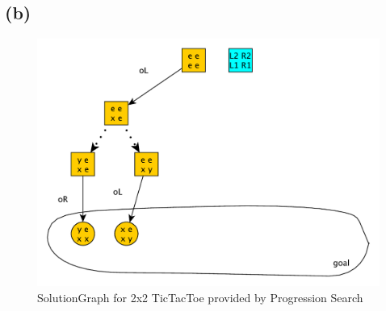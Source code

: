 \documentclass[11pt,a4paper]{article}
\begin{document}
\subsection*{(b)}
\begin{figure}[h!]
\centering
\includegraphics[scale=0.45]{NondeterministicTicTacToe_SolutionGraph}
\caption{SolutionGraph for 2x2 TicTacToe provided by Progression Search}
\end{figure}


\label{lastpage}
\end{document}
